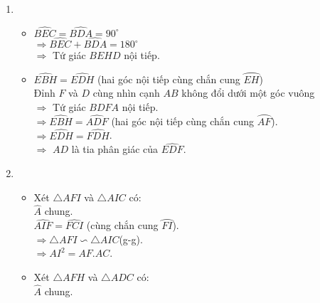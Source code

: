 \begin{ex}
{\begin{enumerate}
{}
      \item 
      	\begin{itemize}
        	\item $\widehat{BEC}=\widehat{BDA}=90^\circ$\\
            $\Rightarrow \widehat{BEC}+\widehat{BDA}=180^\circ$\\
			$\Rightarrow$ Tứ giác $BEHD$ nội tiếp.
            \item $\widehat{EBH}=\widehat{EDH}$ (hai góc nội tiếp cùng chắn cung $\wideparen{EH}$)\\
            Đỉnh $F$ và $D$ cùng nhìn cạnh $AB$ không đổi dưới một góc vuông\\
            $\Rightarrow$ Tứ giác $BDFA$ nội tiếp.\\
            $\Rightarrow \widehat{EBH}=\widehat{ADF}$ (hai góc nội tiếp cùng chắn cung $\wideparen{AF}$).\\
            $\Rightarrow \widehat{EDH}=\widehat{FDH}$.\\
            $\Rightarrow$ $AD$ là tia phân giác của $\widehat{EDF}$.
        \end{itemize}
	  \item 
      	\begin{itemize}
        	\item Xét $\triangle AFI$ và $\triangle AIC$ có:\\
            	$\widehat{A}$ chung.\\
                $\widehat{AIF}=\widehat{FCI}$ (cùng chắn cung $\wideparen{FI}$).\\
                $\Rightarrow \triangle AFI \backsim \triangle AIC$(g-g).\\
                $\Rightarrow AI^2 = AF.AC$.
            \item Xét $\triangle AFH$ và $\triangle ADC$ có:\\
            	$\widehat{A}$ chung.\\

\end{itemize}
\end{enumerate}}
\end{ex}
